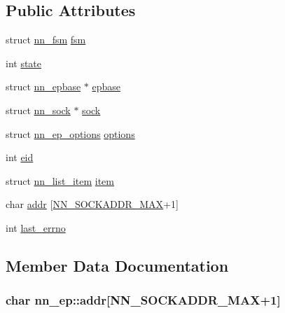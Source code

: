 \subsection*{Public Attributes}
\begin{DoxyCompactItemize}
\item 
struct \hyperlink{structnn__fsm}{nn\+\_\+fsm} \hyperlink{structnn__ep_a5e31919281d05cadde1b39f15d1247c7}{fsm}
\item 
int \hyperlink{structnn__ep_a84d29e1ab854c45678ba5cb07b525a33}{state}
\item 
struct \hyperlink{structnn__epbase}{nn\+\_\+epbase} $\ast$ \hyperlink{structnn__ep_af2099da4aa3cfa0d0c795262ff41cc89}{epbase}
\item 
struct \hyperlink{structnn__sock}{nn\+\_\+sock} $\ast$ \hyperlink{structnn__ep_a089f04f3d0b46462884350c430a417e9}{sock}
\item 
struct \hyperlink{structnn__ep__options}{nn\+\_\+ep\+\_\+options} \hyperlink{structnn__ep_a8b72c5b686aa263c18bb2a3219f2376f}{options}
\item 
int \hyperlink{structnn__ep_a16c6bc677912a107ba3a353252e8b09a}{eid}
\item 
struct \hyperlink{structnn__list__item}{nn\+\_\+list\+\_\+item} \hyperlink{structnn__ep_a2e46eb5aa8bd437a60f448d312e21d6e}{item}
\item 
char \hyperlink{structnn__ep_a596bc0e54a7247ab94a7e4cf4d6f3229}{addr} \mbox{[}\hyperlink{nn_8h_a9b3759ef32562c8b4f0c8c75f54c8b03}{N\+N\+\_\+\+S\+O\+C\+K\+A\+D\+D\+R\+\_\+\+M\+AX}+1\mbox{]}
\item 
int \hyperlink{structnn__ep_a415457d365d9964da0a4ef7627698ad0}{last\+\_\+errno}
\end{DoxyCompactItemize}


\subsection{Member Data Documentation}
\subsubsection[{addr}]{\setlength{\rightskip}{0pt plus 5cm}char nn\+\_\+ep\+::addr\mbox{[}{\bf N\+N\+\_\+\+S\+O\+C\+K\+A\+D\+D\+R\+\_\+\+M\+AX}+1\mbox{]}}\hypertarget{structnn__ep_a596bc0e54a7247ab94a7e4cf4d6f3229}{}\label{structnn__ep_a596bc0e54a7247ab94a7e4cf4d6f3229}
